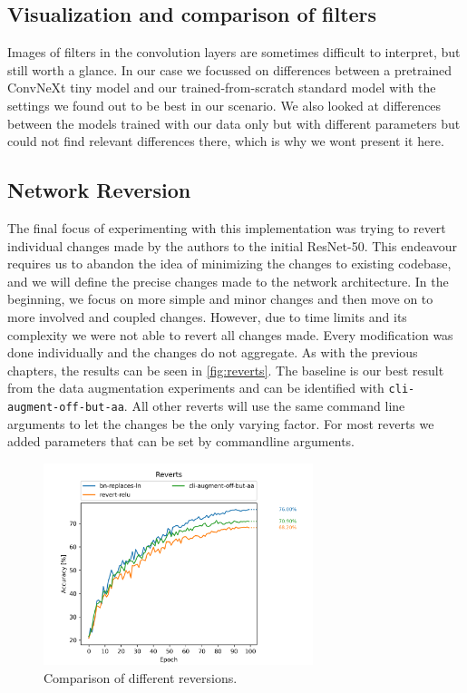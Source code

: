 \documentclass{article}
\begin{document}
\subsection{Visualization and comparison of filters}\label{subsec:filter-images}
Images of filters in the convolution layers are sometimes difficult to interpret, but still worth a glance.
In our case we focussed on differences between a pretrained ConvNeXt tiny model and our trained-from-scratch standard model with the settings we found out to be best in our scenario.
We also looked at differences between the models trained with our data only but with different parameters but could not find relevant differences there, which is why we wont present it here.

\subsection{Network Reversion}\label{subsec:network-reversion}
The final focus of experimenting with this implementation was trying to revert individual changes made by the authors to the initial ResNet-50.
This endeavour requires us to abandon the idea of minimizing the changes to existing codebase, and we will define the precise changes made to the network architecture.
In the beginning, we focus on more simple and minor changes and then move on to more involved and coupled changes.
However, due to time limits and its complexity we were not able to revert all changes made.
Every modification was done individually and the changes do not aggregate.
As with the previous chapters, the results can be seen in \autoref{fig:reverts}.
The baseline is our best result from the data augmentation experiments and can be identified with \texttt{cli-augment-off-but-aa}.
All other reverts will use the same command line arguments to let the changes be the only varying factor.
For most reverts we added parameters that can be set by commandline arguments.

\begin{figure}[h]
    \centering
    \includegraphics[width=0.7\textwidth]{images/reverts}
    \caption{Comparison of different reversions.}
    \label{fig:reverts}
\end{figure}
\end{document}
